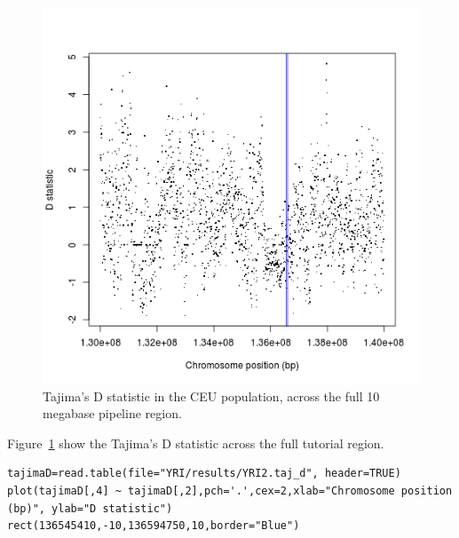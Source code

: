 \documentclass[a4paper,10pt]{article}
\begin{document}
\begin{figure}
\centering
\includegraphics{pictures/CEUtajimas.png}
\caption{Tajima's D statistic in the CEU population, across the full 10 megabase pipeline region.}
\label{fig:tajceu}
\end{figure}

\noindent
Figure~\ref{fig:tajceu} show the Tajima's D statistic across the full tutorial region.

\begin{verbatim}
tajimaD=read.table(file="YRI/results/YRI2.taj_d", header=TRUE)
plot(tajimaD[,4] ~ tajimaD[,2],pch='.',cex=2,xlab="Chromosome position (bp)", ylab="D statistic")
rect(136545410,-10,136594750,10,border="Blue") 
\end{verbatim}
\end{document}
